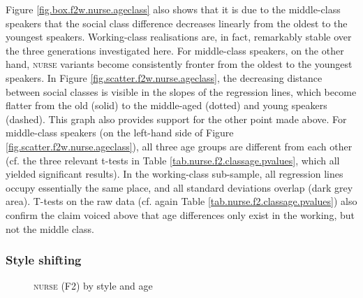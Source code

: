 Figure \ref{fig.box.f2w.nurse.ageclass} also shows that it is due to the middle-class speakers that the social class difference decreases linearly from the oldest to the youngest speakers.
Working-class realisations are, in fact, remarkably stable over the three generations investigated here.
For middle-class speakers, on the other hand, \textsc{nurse} variants become consistently fronter from the oldest to the youngest speakers.
In Figure \ref{fig.scatter.f2w.nurse.ageclass}, the decreasing distance between social classes is visible in the slopes of the regression lines, which become flatter from the old (solid) to the middle-aged (dotted) and young speakers (dashed).
This graph also provides support for the other point made above.
For middle-class speakers (on the left-hand side of Figure \ref{fig.scatter.f2w.nurse.ageclass}), all three age groups are different from each other (cf. the three relevant t-tests in Table \ref{tab.nurse.f2.classage.pvalues}, which all yielded significant results).
In the working-class sub-sample, all regression lines occupy essentially the same place, and all standard deviations overlap (dark grey area).
T-tests on the raw data (cf. again Table \ref{tab.nurse.f2.classage.pvalues}) also confirm the claim voiced above that age differences only exist in the working, but not the middle class.

\subsubsection{Style shifting}
\label{sec.prod.res.vow.nurse.f2.shifting}

\begin{figure}[h!]
	\centering
		\resizebox{0.5\linewidth}{!}{} 
	\caption{\textsc{nurse} (F2) by style and age}
	\label{fig.line.f2.nurse.tot}
\end{figure}

